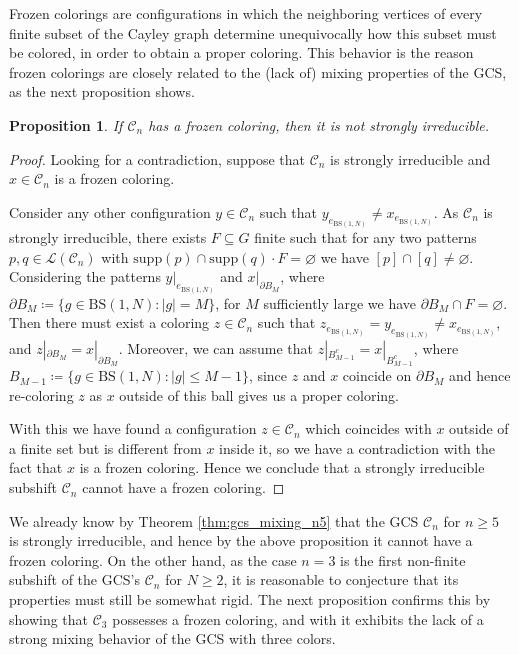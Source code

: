 \documentclass[cupthm,crop,info]{CUP-JNL-ETS}%
\theoremstyle{cupplain}
\newtheorem{proposition}[theorem]{Proposition}
\theoremstyle{cupdefinition}
\theoremstyle{cupremark}
\theoremstyle{cupproof}
\newtheorem{proof}{Proof}
\numberwithin{equation}{section}
\newcommand{\BS}[1][N]{\mathrm{BS}(1,#1)}
\begin{document}
Frozen colorings are configurations in which the neighboring vertices of every finite subset of the Cayley graph determine unequivocally how this subset must be colored, in order to obtain a proper coloring. This behavior is the reason frozen colorings are closely related to the (lack of) mixing properties of the GCS, as the next proposition shows.
\begin{proposition} \label{prop:froz_col_not_si} If $\mathcal{C}_n$ has a frozen coloring, then it is not strongly irreducible.
\end{proposition}
\begin{proof}
	
	Looking for a contradiction, suppose that $\mathcal{C}_n$ is strongly irreducible and $x\in \mathcal{C}_n$ is a frozen coloring. 
	
	Consider any other configuration $y\in \mathcal{C}_n$ such that $y_{e_{\BS}}\neq x_{e_{\BS}}$. As $\mathcal{C}_n$ is strongly irreducible, there exists $F\subseteq G$ finite such that for any two patterns $p,q\in \mathcal{L}(\mathcal{C}_n)$ with $\mathrm{supp}(p)\cap \mathrm{supp}(q)\cdot F=\varnothing$ we have $[p]\cap [q]\neq \varnothing$. Considering the patterns $y|_{e_{\BS}}$ and $x|_{\partial B_M}$, where $\partial B_M\coloneqq \{g\in \BS: |g|=M\}$, for $M$ sufficiently large we have $\partial B_M \cap F= \varnothing$. Then there must exist a coloring $z\in \mathcal{C}_n$ such that $z_{e_{\BS}}=y_{e_{\BS}}\neq x_{e_{\BS}}$, and $z|_{\partial B_M}=x|_{\partial B_M}$. Moreover, we can assume that $z|_{B_{M-1}^c}=x|_{B_{M-1}^c}$, where $B_{M-1}\coloneqq \{g\in \BS: |g|\le M-1 \}$, since $z$ and $x$ coincide on $\partial B_M$ and hence re-coloring $z$ as $x$ outside of this ball gives us a proper coloring. 
	
	With this we have found a configuration $z\in \mathcal{C}_n$ which coincides with $x$ outside of a finite set but is different from $x$ inside it, so we have a contradiction with the fact that $x$ is a frozen coloring. Hence we conclude that a strongly irreducible subshift $\mathcal{C}_n$ cannot have a frozen coloring.
\end{proof}
We already know by Theorem \ref{thm:gcs_mixing_n5} that the GCS $\mathcal{C}_n$ for $n\ge 5$ is strongly irreducible, and hence by the above proposition it cannot have a frozen coloring. On the other hand, as the case $n=3$ is the first non-finite subshift of the GCS's $\mathcal{C}_n$ for $N\ge 2$, it is reasonable to conjecture that its properties must still be somewhat rigid. The next proposition confirms this by showing that $\mathcal{C}_3$ possesses a frozen coloring, and with it exhibits the lack of a strong mixing behavior of the GCS with three colors.
\end{document}
